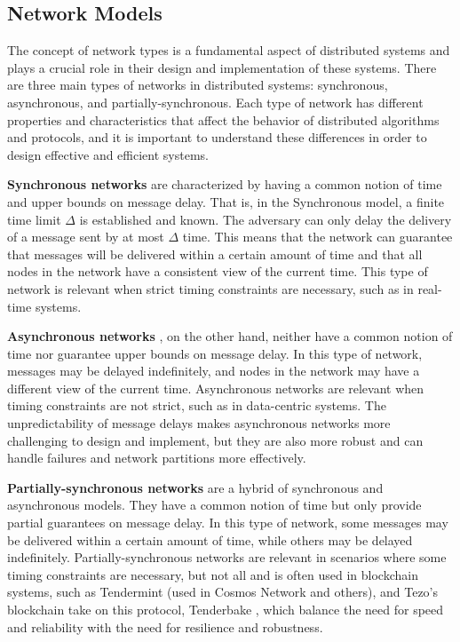 \subsection*{\textbf{Network Models}}

The concept of network types is a fundamental aspect of distributed systems and plays a crucial role in their design and implementation of these systems. There are three main types of networks in distributed systems: synchronous, asynchronous, and partially-synchronous. Each type of network has different properties and characteristics that affect the behavior of distributed algorithms and protocols, and it is important to understand these differences in order to design effective and efficient systems.

\textbf{Synchronous networks} are characterized by having a common notion of time and upper bounds on message delay. 
That is, in the Synchronous model, a finite time limit $\Delta$ is established and known. The adversary can only delay the delivery of a message sent by at most $\Delta$ time.
This means that the network can guarantee that messages will be delivered within a certain amount of time and that all nodes in the network have a consistent view of the current time. This type of network is relevant when strict timing constraints are necessary, such as in real-time systems.

\textbf{Asynchronous networks} \cite{bracha1985asynchronous}, on the other hand, neither have a common notion of time nor guarantee upper bounds on message delay. 
In this type of network, messages may be delayed indefinitely, and nodes in the network may have a different view of the current time. Asynchronous networks are relevant when timing constraints are not strict, such as in data-centric systems. The unpredictability of message delays makes asynchronous networks more challenging to design and implement, but they are also more robust and can handle failures and network partitions more effectively.

\textbf{Partially-synchronous networks} \cite{dwork1988consensus} are a hybrid of synchronous and asynchronous models.
They have a common notion of time but only provide partial guarantees on message delay. In this type of network, some messages may be delivered within a certain amount of time, while others may be delayed indefinitely. Partially-synchronous networks are relevant in scenarios where some timing constraints are necessary, but not all and is often used in blockchain systems, such as Tendermint \cite{buchman2016tendermint}(used in Cosmos Network \cite{tendermintinc}and others), and Tezo's blockchain take on this protocol, Tenderbake \cite{acstefanoaei2020tenderbake}, which balance the need for speed and reliability with the need for resilience and robustness.

